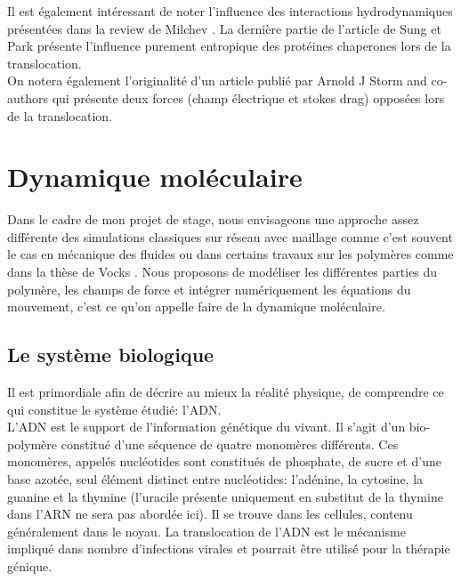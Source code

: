 \documentclass[a4paper,11pt]{article}
\begin{document}
Il est également intéressant de noter l'influence des interactions hydrodynamiques présentées dans la review de Milchev \cite{milchev}. La dernière partie de l'article de Sung et Park \cite{sung} présente l'influence purement entropique des protéines chaperones lors de la translocation.\\

On notera également l'originalité d'un article publié par Arnold J Storm and co-authors \cite{storm} qui présente deux forces (champ électrique et stokes drag) opposées lors de la translocation.



\newpage 

\section{Dynamique moléculaire}

Dans le cadre de mon projet de stage, nous envisageons une approche assez différente des simulations classiques sur réseau avec maillage comme c'est souvent le cas en mécanique des fluides ou dans certains travaux sur les polymères comme dans la thèse de Vocks \cite{these}. Nous proposons de modéliser les différentes parties du polymère, les champs de force et intégrer numériquement les équations du mouvement, c'est ce qu'on appelle faire de la dynamique moléculaire.

\subsection{Le système biologique}

Il est primordiale afin de décrire au mieux la réalité physique, de comprendre ce qui constitue le système étudié: l'ADN.\\

L'ADN est le support de l'information génétique du vivant. Il s'agit d'un bio-polymère constitué d'une séquence de quatre monomères différents. Ces monomères, appelés nucléotides sont constitués de phosphate, de sucre et d'une base azotée, seul élément distinct entre nucléotides: l'adénine, la cytosine, la guanine et la thymine (l'uracile présente uniquement en substitut de la thymine dans l'ARN ne sera pas abordée ici). Il se trouve dans les cellules, contenu généralement dans le noyau. La translocation de l'ADN est le mécanisme impliqué dans nombre d'infections virales et pourrait être utilisé pour la thérapie génique.
\end{document}
